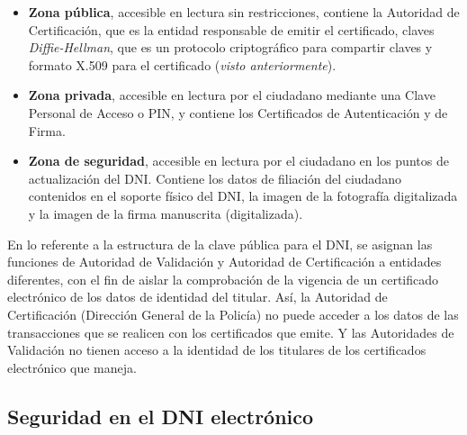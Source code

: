 \documentclass{manual}
\begin{document}
\begin{itemize}

	\item \textbf{Zona pública}, accesible en lectura sin restricciones, contiene la Autoridad de Certificación, que es la entidad responsable de emitir el certificado, claves \textit{Diffie-Hellman}, que es un protocolo criptográfico para compartir claves y formato X.509 para el certificado (\textit{visto anteriormente}).
	
		
	\item \textbf{Zona privada}, accesible en lectura por el ciudadano mediante una Clave Personal de Acceso o PIN, y contiene los Certificados de Autenticación y de Firma.
		
		
	\item \textbf{Zona de seguridad}, accesible en lectura por el ciudadano en los puntos de actualización del DNI. Contiene los datos de filiación del ciudadano contenidos en el soporte físico del DNI, la imagen de la fotografía digitalizada y la imagen de la firma manuscrita (digitalizada).
		
\end{itemize}

En lo referente a la estructura de la clave pública para el DNI, se asignan las funciones de Autoridad de Validación y Autoridad de Certificación a entidades diferentes, con el fin de aislar la comprobación de la vigencia de un certificado electrónico de los datos de identidad del titular. Así, la Autoridad de Certificación (Dirección General de la Policía) no puede acceder a los datos de las transacciones que se realicen con los certificados que emite. Y las Autoridades de Validación no tienen acceso a la identidad de los titulares de los certificados electrónico que maneja.



\subsection{Seguridad en el DNI electrónico}

\end{document}
